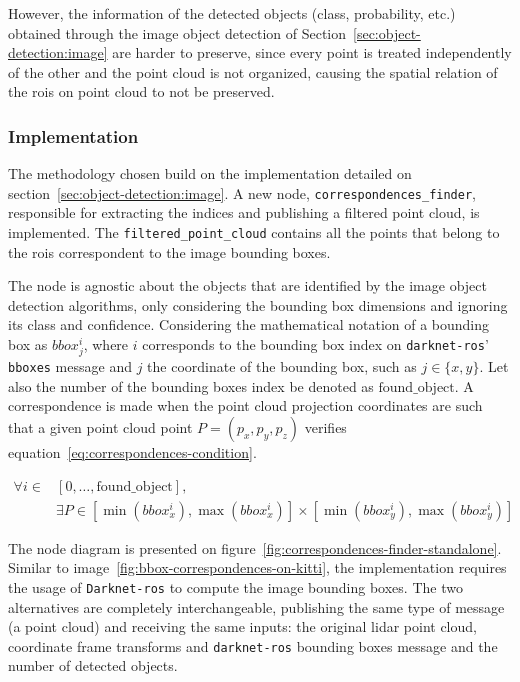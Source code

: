 However, the information of the detected objects (class, probability, etc.) obtained through the image object detection of Section~\ref{sec:object-detection:image} are harder to preserve, since every point is treated independently of the other and the point cloud is not organized, causing the spatial relation of the \acp{roi} on point cloud to not be preserved.


\subsubsection{Implementation}
The methodology chosen build on the implementation detailed on section~\ref{sec:object-detection:image}. A new node, \texttt{correspondences\_finder}, responsible for extracting the indices and  publishing a filtered point cloud, is implemented. The \texttt{filtered\_point\_cloud} contains all the points that belong to the \acp{roi} correspondent to the image bounding boxes. 

The node is agnostic about the objects that are identified by the image object detection algorithms, only considering the bounding box dimensions and ignoring its class and confidence. Considering the mathematical notation of a bounding box as $bbox^i_j$, where $i$ corresponds to the bounding box index on \texttt{darknet-ros}' \texttt{bboxes} message and $j$ the coordinate of the bounding box, such as $j \in \{x, y\}$. Let also the number of the bounding boxes index be denoted as $\text{found\_object}$. A correspondence is made when the point cloud projection coordinates are such that a given point cloud point $P = (p_x, p_y,p_z)$ verifies equation~\ref{eq:correspondences-condition}.

\begin{align}
	\label{eq:correspondences-condition}
	\forall i \in & [0, \ldots, \text{found\_object}], \nonumber \\ 
			& \exists P \in [\min(bbox^i_x), \max(bbox^i_x)] \times[\min(bbox^i_y), \max(bbox^i_y)] 
\end{align}

The node diagram is presented on figure~\ref{fig:correspondences-finder-standalone}. Similar to image~\ref{fig:bbox-correspondences-on-kitti}, the implementation requires the usage of \texttt{Darknet-ros} to compute the image bounding boxes. The two alternatives are completely interchangeable, publishing the same type of message (a point cloud) and receiving the same inputs: the original \ac{lidar} point cloud, coordinate frame transforms and \texttt{darknet-ros} bounding boxes message and the number of detected objects.

